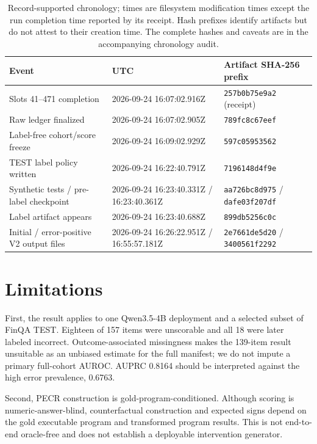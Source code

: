 \documentclass[11pt]{article}
\begin{document}
\begin{table}[t]
\centering\scriptsize
\begin{tabular}{@{}p{}p{}p{}@{}}
\toprule
Event & UTC & Artifact SHA-256 prefix \\
\midrule
Slots 41--471 completion & 2026-09-24 16:07:02.916Z & \texttt{257b0b75e9a2} (receipt) \\
Raw ledger finalized & 2026-09-24 16:07:02.905Z & \texttt{789fc8c67eef} \\
Label-free cohort/score freeze & 2026-09-24 16:09:02.929Z & \texttt{597c05953562} \\
TEST label policy written & 2026-09-24 16:22:40.791Z & \texttt{7196148d4f9e} \\
Synthetic tests / pre-label checkpoint & 2026-09-24 16:23:40.331Z / 16:23:40.361Z & \texttt{aa726bc8d975} / \texttt{dafe03f207df} \\
Label artifact appears & 2026-09-24 16:23:40.688Z & \texttt{899db5256c0c} \\
Initial / error-positive V2 output files & 2026-09-24 16:26:22.951Z / 16:55:57.181Z & \texttt{2e7661de5d20} / \texttt{3400561f2292} \\
\bottomrule
\end{tabular}
\caption{Record-supported chronology; times are filesystem modification times except the run completion time reported by its receipt. Hash prefixes identify artifacts but do not attest to their creation time. The complete hashes and caveats are in the accompanying chronology audit.}
\label{tab:chronology}
\end{table}

\section{Limitations}
First, the result applies to one Qwen3.5-4B deployment and a selected subset of FinQA TEST. Eighteen of 157 items were unscorable and all 18 were later labeled incorrect. Outcome-associated missingness makes the 139-item result unsuitable as an unbiased estimate for the full manifest; we do not impute a primary full-cohort AUROC. AUPRC 0.8164 should be interpreted against the high error prevalence, 0.6763.

Second, PECR construction is gold-program-conditioned. Although scoring is numeric-answer-blind, counterfactual construction and expected signs depend on the gold executable program and transformed program results. This is not end-to-end oracle-free and does not establish a deployable intervention generator.
\end{document}
